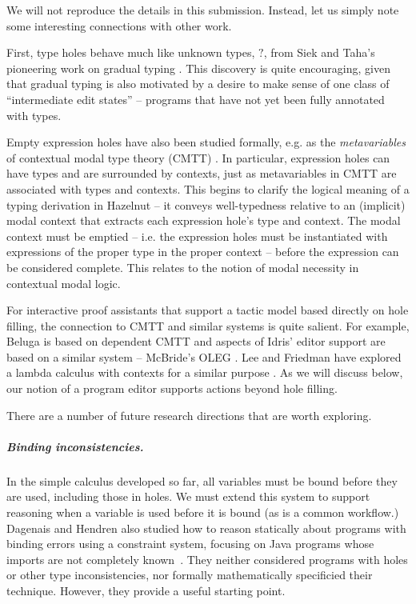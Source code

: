 \documentclass[letterpaper,USenglish]{lipics-v2016}
\begin{document}
 We will not reproduce the details in this submission. Instead, let us simply note some interesting connections with other work. 

 First, type holes behave much like unknown types, $?$, from Siek and Taha's pioneering work on gradual typing \cite{Siek06a}. This discovery is quite encouraging, given that gradual typing is also motivated by a 
desire to make sense of one class of ``intermediate edit states'' -- programs that
have not yet been fully annotated with types.

Empty expression holes have also been studied formally, e.g. as the \emph{metavariables} 
of contextual modal type theory (CMTT) \cite{DBLP:journals/tocl/NanevskiPP08}. In particular, expression
holes can have types and are surrounded by contexts, just as metavariables in
CMTT are associated with types and contexts. This begins to clarify the
logical meaning of a typing derivation in Hazelnut -- it conveys
well-typedness relative to an (implicit) modal context that extracts each
expression hole's type and context. The modal context must be emptied --
i.e. the expression holes must be instantiated with expressions of the
proper type in the proper context -- before the expression can be
considered complete. This relates to the notion of modal necessity in
contextual modal logic.

For interactive
proof assistants that support a tactic model based directly on hole
filling, the connection to CMTT and similar systems is quite salient. For
example, Beluga \cite{DBLP:conf/flops/Pientka10} is based on dependent CMTT
and aspects of Idris' editor support \cite{brady2013idris} are based on a similar system -- 
McBride's OLEG \cite{mcbride2000dependently}. Lee and Friedman have
explored a lambda calculus with contexts for a similar
purpose \cite{DBLP:conf/icfp/LeeF96}. As we will discuss below, our notion of a program editor supports actions beyond hole filling.

There are a number of future research directions that are worth exploring.

\subparagraph{Binding inconsistencies.} In the simple calculus developed so far,
    all variables must be bound before they are used,
    including those in holes. We must extend this system to support reasoning
    when a variable is used before it is bound (as is a common workflow.) Dagenais and
    Hendren also studied how to reason statically about programs
    with binding errors using a constraint system, focusing on
    Java programs whose imports are not completely known~\cite{DBLP:conf/oopsla/DagenaisH08}. They neither
    considered programs with holes or other type inconsistencies,
    nor formally mathematically specificied their
    technique. However, they provide a useful starting point.
\end{document}
